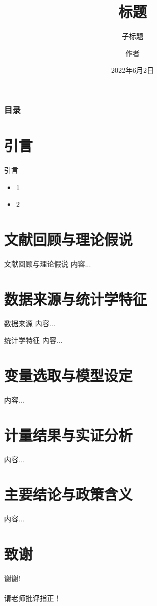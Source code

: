 \documentclass{beamer}
\author[Author]{作者}
\title[标题]{标题}
\subtitle{子标题}
\institute[HZAU]{华中农业大学
	
	经济管理学院}
\date[2022.06.02]{2022年6月2日}
\begin{document}
	\kaishu
	
	\frame{\titlepage}
	
	\begin{frame}
		\frametitle{目录}
		\tableofcontents
	\end{frame}
	
	\section{引言}
	\begin{frame}{引言}
		\begin{itemize}
			\item 1
			\item 2
		\end{itemize}
	\end{frame}

	\section{文献回顾与理论假说}
	\begin{frame}{文献回顾与理论假说}
		内容...
	\end{frame}
	
	\section{数据来源与统计学特征}
	\begin{frame}{数据来源}
		内容...
	\end{frame}
	\begin{frame}{统计学特征}
		内容...
	\end{frame}

	\section{变量选取与模型设定}
	\begin{frame}{}
		内容...
	\end{frame}

	\section{计量结果与实证分析}
	\begin{frame}{}
		内容...
	\end{frame}

	\section{主要结论与政策含义}
	\begin{frame}{}
		内容...
	\end{frame}
	
	\section*{致谢}  
	\begin{frame}
		\begin{center}
			\textcolor{myNewColorA}{\huge {谢谢!\\ \quad \\ 请老师批评指正！}}
		\end{center}
	\end{frame}
	
\end{document}
